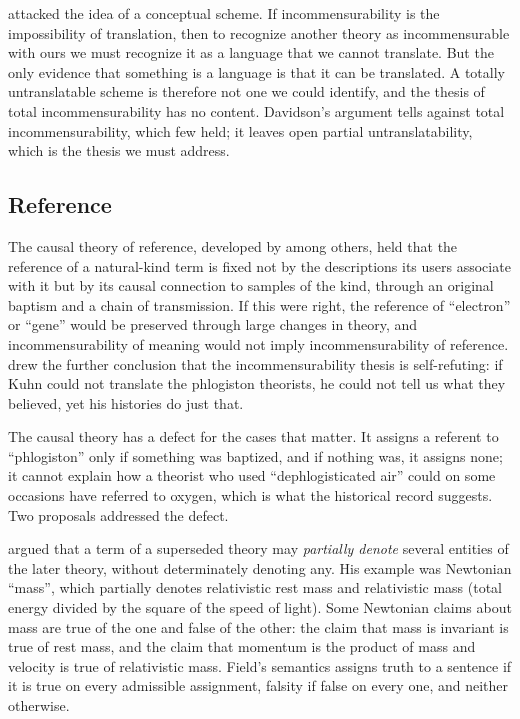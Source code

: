 \documentclass{situationist-preprint}
\begin{document}
\citet{Davidson1974} attacked the idea of a conceptual scheme. If incommensurability is the impossibility of translation, then to recognize another theory as incommensurable with ours we must recognize it as a language that we cannot translate. But the only evidence that something is a language is that it can be translated. A totally untranslatable scheme is therefore not one we could identify, and the thesis of total incommensurability has no content. Davidson's argument tells against total incommensurability, which few held; it leaves open partial untranslatability, which is the thesis we must address.

\subsection{Reference}

The causal theory of reference, developed by \citet{Putnam1975} among others, held that the reference of a natural-kind term is fixed not by the descriptions its users associate with it but by its causal connection to samples of the kind, through an original baptism and a chain of transmission. If this were right, the reference of \enquote{electron} or \enquote{gene} would be preserved through large changes in theory, and incommensurability of meaning would not imply incommensurability of reference. \citet{Putnam1981} drew the further conclusion that the incommensurability thesis is self-refuting: if Kuhn could not translate the phlogiston theorists, he could not tell us what they believed, yet his histories do just that.

The causal theory has a defect for the cases that matter. It assigns a referent to \enquote{phlogiston} only if something was baptized, and if nothing was, it assigns none; it cannot explain how a theorist who used \enquote{dephlogisticated air} could on some occasions have referred to oxygen, which is what the historical record suggests. Two proposals addressed the defect.

\citet{Field1973} argued that a term of a superseded theory may \emph{partially denote} several entities of the later theory, without determinately denoting any. His example was Newtonian \enquote{mass}, which partially denotes relativistic rest mass and relativistic mass (total energy divided by the square of the speed of light). Some Newtonian claims about mass are true of the one and false of the other: the claim that mass is invariant is true of rest mass, and the claim that momentum is the product of mass and velocity is true of relativistic mass. Field's semantics assigns truth to a sentence if it is true on every admissible assignment, falsity if false on every one, and neither otherwise.
\end{document}
